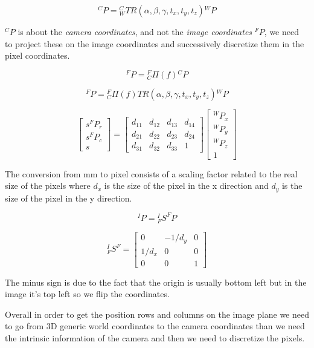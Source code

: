 \[
    {}^CP = {}^C_W TR(\alpha, \beta, \gamma, t_x, t_y, t_z) {}^WP
\]

\({}^CP\) is about the \textit{camera coordinates}, and
not the \textit{image coordinates} \({}^FP\), we need to project these on the image coordinates and successively discretize them in the pixel coordinates.

\[
    {}^FP = {}^F_C \varPi (f) {}^CP
\]

\[
    {}^FP = {}^F_C \varPi (f) TR(\alpha, \beta, \gamma, t_x, t_y, t_z) {}^WP
\]


\[
    \begin{bmatrix}
        s^FP_r \\
        s^FP_c \\
        s
    \end{bmatrix}
    =
    \begin{bmatrix}
        d_{11} & d_{12} & d_{13} & d_{14} \\
        d_{21} & d_{22} & d_{23} & d_{24} \\
        d_{31} & d_{32} & d_{33} & 1
    \end{bmatrix}
    \begin{bmatrix}
        {}^WP_x \\
        {}^WP_y \\
        {}^WP_z \\
        1
    \end{bmatrix}
\]

The conversion from mm to pixel consists of a scaling factor related to the real size of the pixels where \(d_x\) is the size of the pixel in the x direction and \(d_y\) is the size of the pixel in the y direction.

\[
  {}^IP={}^I_F S^F P  
\]


\[
    {}^I_F S^F
    = 
    \begin{bmatrix}
        0 & -1/d_y & 0\\
        1/d_x & 0 & 0\\
        0 & 0 & 1
    \end{bmatrix}
\]

The minus sign is due to the fact that the origin is usually bottom left but in the image it's top left so we flip the coordinates.

Overall in order to get the position rows and columns on the image plane we need to go from 3D generic world coordinates to the camera coordinates than we need the intrinsic information of the camera and then we need to discretize the pixels.

